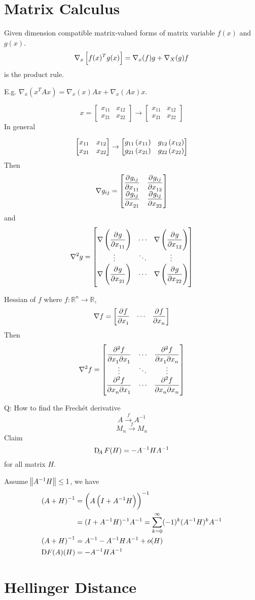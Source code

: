 \documentclass{article}
\newcommand{\m}[1]{\begin{bmatrix} #1 \end{bmatrix}}
\newcommand{\RR}{\mathbb{R}}
\begin{document}
\section{Matrix Calculus}

Given dimension compatible matrix-valued forms of matrix variable \(f(x)\) and \(g(x)\).
\[\nabla_x \sbr{f(x)^T g(x)} = \nabla_x(f)g + \nabla_X(g) f\]
is the product rule.

E.g. \(\nabla_x(x^TAx) = \nabla_x(x) Ax + \nabla_x(Ax)x\).


\[x = \m{x_{11} & x_{12}\\ x_{21} & x_{22} } \to\m{x_{11} & x_{12}\\ x_{21} & x_{22} } \]
In general

\[ \m{x_{11} & x_{12}\\ x_{21} & x_{22} } \to\m{g_{11}\del{x_{11}} & g_{12}\del{x_{12}}\\ g_{21}\del{x_{21}} & g_{22}\del{x_{22}} } \]
Then
\[\nabla g_{ij} = \m{\dpd{g_{ij}}{x_{11}} & \dpd{g_{ij}}{x_{12}} \\ \dpd{g_{ij}}{x_{21}} & \dpd{g_{ij}}{x_{22}}}\]
and
\[\nabla^2 g = \m{\nabla\del{\dpd{g}{x_{11}}} & \cdots & \nabla\del{\dpd{g}{x_{12}}}\\ \vdots & \ddots & \vdots\\ \nabla\del{\dpd{g}{x_{21}}} & \cdots & \nabla\del{\dpd{g}{x_{22}}}}\]

Hessian of \(f\) where \(f:\RR^n \to \RR \),
\[\nabla f = \m{\dpd{f}{x_1} & \cdots & \dpd{f}{x_n}}\]
Then
\[\nabla^2 f = \m{\dmd{f}{2}{x_1}{}{x_1}{} & \cdots & \dmd{f}{2}{x_1}{}{x_n}{}\\ \vdots & \ddots & \vdots \\\dmd{f}{2}{x_n}{}{x_1}{} & \cdots & \dmd{f}{2}{x_n}{}{x_n}{}}\]

Q: How to find the Frech\'et derivative
\[A \stackrel{f}{\to} A^{-1}\]
\[M_n \stackrel{f}{\to} M_n\]
Claim
\[\Dif_A F(H) = -A^{-1}HA^{-1}\]
for all matrix \(H\).

Assume \( \norm{A^{-1}H} \leq 1\), we have
\begin{align*}
  \del{A+H}^{-1}
  &= \del{A\del{I + A^{-1}H}}^{-1}\\
  &= (I + A^{-1}H)^{-1} A^{-1} = \sum_{k=0}^\infty (-1)^k (A^{-1}H)^kA^{-1}\\
  \del{A+H}^{-1} &= A^{-1} - A^{-1}HA^{-1} + o(H)\\
  \Dif F(A)(H) &= -A^{-1}HA^{-1}
\end{align*}

\section{Hellinger Distance}
\end{document}
